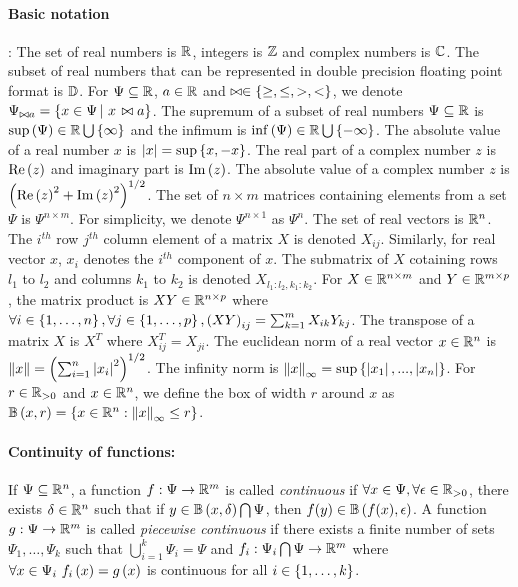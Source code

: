 \paragraph{Basic notation}:  The set of real numbers is $\mathbb{R}$,
integers is $\mathbb{Z}$ and complex numbers is $\mathbb{C}$.  The subset
of real numbers that can be represented in double precision floating
point format is $\mathbb{D}$.  For $\Psi\subseteq\mathbb{R}$, $a\in\mathbb{R}$
and $\bowtie\in\left\{\geq,\leq,>,<\right\}$, we denote $\Psi_{\bowtie a}
= \left\{ x\in\Psi \left|~x\right. \bowtie a \right\}$.  The supremum of a subset of real
numbers $\Psi\subseteq\mathbb{R}$ is
$\sup\left(\Psi\right)\in\mathbb{R}\bigcup\left\{\infty\right\}$ and the infimum is
$\inf\left(\Psi\right)\in\mathbb{R}\bigcup\left\{-\infty\right\}$.  The absolute value of a
real number $x$ is $\left|x\right| = \sup\left\{x,-x\right\}$.  The real part of a
complex number $z$ is $\operatorname{Re}\left(z\right)$ and imaginary part is $\operatorname{Im}\left(z\right)$.  The
absolute value of a complex number $z$ is $\left(\operatorname{Re}\left(z\right)^2
+ \operatorname{Im}\left(z\right)^2\right)^{1/2}$.  %
The set of $n\times m$ matrices containing elements from a set $\Psi$
is $\Psi^{n\times m}$.  For simplicity, we denote $\Psi^{n\times 1}$
as $\Psi^n$.  The set of real vectors is $\mathbb{R}^n$.  The $i^{th}$ row
$j^{th}$ column element of a matrix $X$ is denoted $X_{ij}$.
Similarly, for real vector $x$, $x_i$ denotes the $i^{th}$ component
of $x$.  The submatrix of $X$ cotaining rows $l_1$ to $l_2$ and
columns $k_1$ to $k_2$ is denoted $X_{l_1:l_2,k_1:k_2}$.  For
$X\in\mathbb{R}^{n\times m}$ and $Y\in\mathbb{R}^{m\times p}$, the matrix
product is $XY\in\mathbb{R}^{n\times p}$ where $\forall
i\in\left\{1,\ldots,n\right\},\forall j\in\left\{1,\ldots,p\right\},\left(XY\right)_{ij}
= \sum_{k=1}^{m}X_{ik}Y_{kj}$.  The transpose of a matrix $X$ is $X^T$
where $X^T_{ij} = X_{ji}$.  The euclidean norm of a real vector
$x\in\mathbb{R}^n$ is $\left\|x\right\| = \left(\sum_{i=1}^n\left|x_i\right|^2\right)^{1/2}$.
The infinity norm is $\left\|x\right\|_\infty
= \sup\left\{\left|x_1\right|,...,\left|x_n\right|\right\}$.  For $r\in\mathbb{R}_{> 0}$ and
$x\in\mathbb{R}^n$, we define the box of width $r$ around $x$ as
$\mathbb{B}\left(x,r\right) = \left\{ x\in\mathbb{R}^n: \left\|x\right\|_\infty \leq r \right\}$.
%
\paragraph{Continuity of functions:} If $\Psi\subseteq\mathbb{R}^n$, a
function $f:\Psi\rightarrow\mathbb{R}^m$ is called \emph{continuous} if
$\forall x\in\Psi,\forall\epsilon\in\mathbb{R}_{>0}$, there exists
$\delta\in\mathbb{R}^n$ such that if $y\in\mathbb{B}\left(x,\delta\right)\bigcap\Psi$,
then $f(y)\in\mathbb{B}\left(f(x),\epsilon\right)$.  A function
$g:\Psi\rightarrow\mathbb{R}^m$ is called \emph{piecewise continuous} if
there exists a finite number of sets $\Psi_1,\ldots,\Psi_k$ such that
$\bigcup_{i=1}^k\Psi_i=\Psi$ and
$f_i:\Psi_i\bigcap\Psi\rightarrow \mathbb{R}^m$ where $\forall x\in\Psi_i~f_i\left(x\right)=g\left(x\right)$ is continuous for all
$i\in\left\{1,\ldots,k\right\}$.
%
